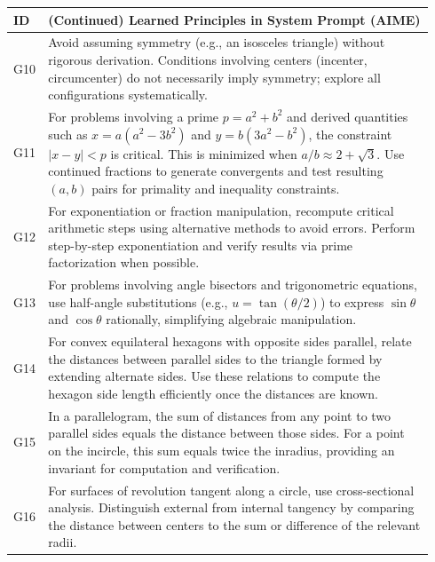 \documentclass{article}
\theoremstyle{plain}
\theoremstyle{definition}
\theoremstyle{remark}
\begin{document}
\begin{table}[h]
\centering
\small
\setlength{\tabcolsep}{6pt}
\renewcommand{\arraystretch}{1.4}
\begin{tabular}{p{0.04\linewidth} p{0.9\linewidth}}
\toprule
\textbf{ID} & \textbf{(Continued) Learned Principles in System Prompt (AIME)} \\
\midrule

G10 & Avoid assuming symmetry (e.g., an isosceles triangle) without rigorous derivation. Conditions involving centers (incenter, circumcenter) do not necessarily imply symmetry; explore all configurations systematically. \\

G11 & For problems involving a prime \(p = a^2 + b^2\) and derived quantities such as \(x = a(a^2 - 3b^2)\) and \(y = b(3a^2 - b^2)\), the constraint \(|x-y| < p\) is critical. This is minimized when \(a/b \approx 2+\sqrt{3}\). Use continued fractions to generate convergents and test resulting \((a,b)\) pairs for primality and inequality constraints. \\

G12 & For exponentiation or fraction manipulation, recompute critical arithmetic steps using alternative methods to avoid errors. Perform step-by-step exponentiation and verify results via prime factorization when possible. \\

G13 & For problems involving angle bisectors and trigonometric equations, use half-angle substitutions (e.g., \(u=\tan(\theta/2)\)) to express \(\sin\theta\) and \(\cos\theta\) rationally, simplifying algebraic manipulation. \\

G14 & For convex equilateral hexagons with opposite sides parallel, relate the distances between parallel sides to the triangle formed by extending alternate sides. Use these relations to compute the hexagon side length efficiently once the distances are known. \\

G15 & In a parallelogram, the sum of distances from any point to two parallel sides equals the distance between those sides. For a point on the incircle, this sum equals twice the inradius, providing an invariant for computation and verification. \\

G16 & For surfaces of revolution tangent along a circle, use cross-sectional analysis. Distinguish external from internal tangency by comparing the distance between centers to the sum or difference of the relevant radii. \\


\end{tabular}
\end{table}
\end{document}

